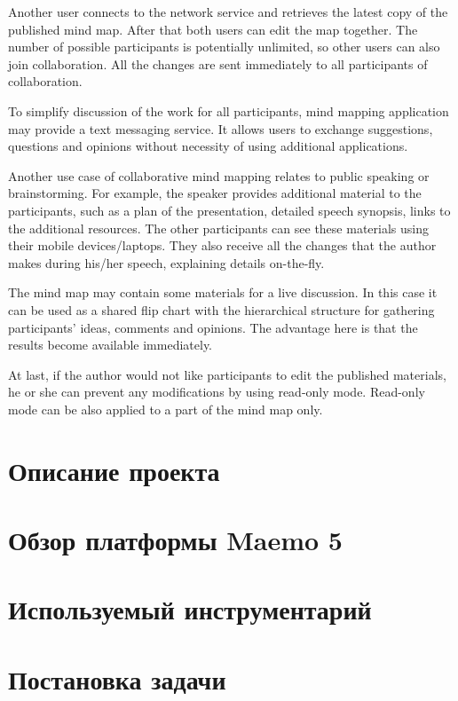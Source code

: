 Another user connects to the network service and retrieves the latest copy of
the published mind map. After that both users can edit the map together. The
number of possible participants is potentially unlimited, so other users can
also join collaboration. All the changes are sent immediately to all
participants of collaboration.

To simplify discussion of the work for all participants, mind mapping
application may provide a text messaging service. It allows users to exchange
suggestions, questions and opinions without necessity of using additional
applications.



Another use case of collaborative mind mapping relates to public speaking or
brainstorming. For example, the speaker provides additional material to the
participants, such as a plan of the presentation, detailed speech synopsis,
links to the additional resources. The other participants can see these
materials using their mobile devices/laptops. They also receive all the changes
that the author makes during his/her speech, explaining details on-the-fly.

The mind map may contain some materials for a live discussion. In this case it
can be used as a shared flip chart with the hierarchical structure for gathering
participants' ideas, comments and opinions. The advantage here is that the
results become available immediately.

At last, if the author would not like participants to edit the published
materials, he or she can prevent any modifications by using read-only mode.
Read-only mode can be also applied to a part of the mind map only.

\section{Описание проекта}\label{sec:project_summary}

\section{Обзор платформы Maemo 5}\label{sec:compare_platforms}

\section{Используемый инструментарий}\label{sec:choose_toolkit}

\section{Постановка задачи}\label{sec:statement_task}
